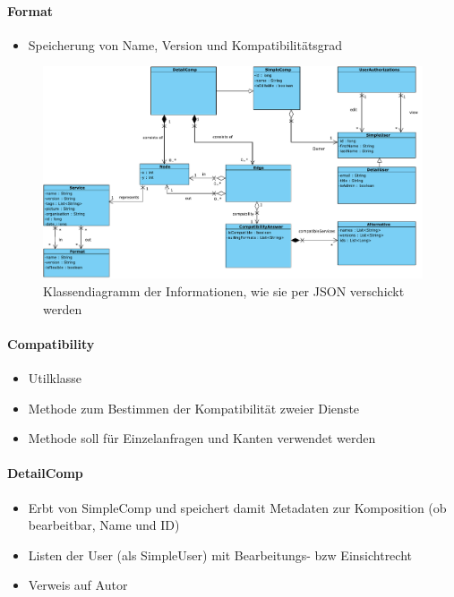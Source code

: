 \paragraph{Format}
\begin{itemize}
	\item Speicherung von Name, Version und Kompatibilitätsgrad
\end{itemize} 

\begin{figure}[!h]
	\centering
	\includegraphics[width=\textwidth]{img/Diagramme/Klassen/Send}
	\caption{Klassendiagramm der Informationen, wie sie per JSON verschickt werden}
	\label{fig:klassendiagramm-model}
\end{figure}



\paragraph{Compatibility}
\begin{itemize}
	\item Utilklasse
	\item Methode zum Bestimmen der Kompatibilität zweier Dienste
	\item Methode soll für Einzelanfragen und Kanten verwendet werden
\end{itemize} 



\paragraph{DetailComp}
\begin{itemize}
	\item Erbt von SimpleComp und speichert damit Metadaten zur Komposition (ob bearbeitbar, Name und ID)
	\item Listen der User (als SimpleUser) mit Bearbeitungs- bzw Einsichtrecht
	\item Verweis auf Autor
\end{itemize}

